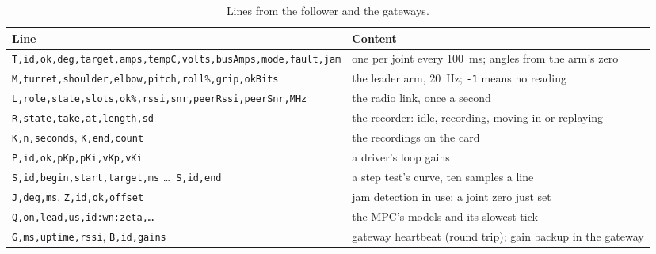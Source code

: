 \documentclass[11pt,a4paper]{article}
\newcommand{\cmd}[1]{\texttt{#1}}
\begin{document}
\begin{table}[H]
\centering\small
\begin{tabularx}{\linewidth}{@{}lL@{}}
\toprule
Line & Content \\
\midrule
\cmd{T,id,ok,deg,target,amps,tempC,volts,busAmps,mode,fault,jam} & one per joint every \SI{100}{\milli\second}; angles
  from the arm's zero \\
\cmd{M,turret,shoulder,elbow,pitch,roll\%,grip,okBits} & the leader arm, \SI{20}{\hertz}; \cmd{-1} means no
  reading \\
\cmd{L,role,state,slots,ok\%,rssi,snr,peerRssi,peerSnr,MHz} & the radio link, once a second \\
\cmd{R,state,take,at,length,sd} & the recorder: idle, recording, moving in or replaying \\
\cmd{K,n,seconds}, \cmd{K,end,count} & the recordings on the card \\
\cmd{P,id,ok,pKp,pKi,vKp,vKi} & a driver's loop gains \\
\cmd{S,id,begin,start,target,ms} \dots\ \cmd{S,id,end} & a step test's curve, ten samples a line \\
\cmd{J,deg,ms}, \cmd{Z,id,ok,offset} & jam detection in use; a joint zero just set \\
\cmd{Q,on,lead,us,id:wn:zeta,\dots} & the MPC's models and its slowest tick \\
\cmd{G,ms,uptime,rssi}, \cmd{B,id,gains} & gateway heartbeat (round trip); gain backup in the gateway \\
\bottomrule
\end{tabularx}
\caption{Lines from the follower and the gateways.}
\end{table}
\end{document}

